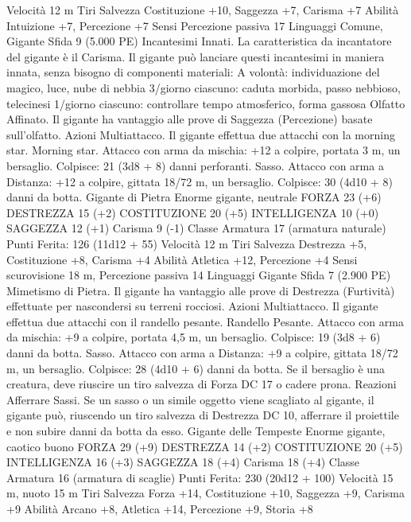 \begin{multicols}{2}
Velocità 12 m
Tiri Salvezza Costituzione +10, Saggezza +7, Carisma +7
Abilità Intuizione +7, Percezione +7
Sensi Percezione passiva 17
Linguaggi Comune, Gigante
Sfida 9 (5.000 PE)
Incantesimi Innati. La caratteristica da incantatore del gigante è
il Carisma. Il gigante può lanciare questi incantesimi in maniera
innata, senza bisogno di componenti materiali:
A volontà: individuazione del magico, luce, nube di nebbia
3/giorno ciascuno: caduta morbida, passo nebbioso, telecinesi
1/giorno ciascuno: controllare tempo atmosferico, forma gassosa
Olfatto Affinato. Il gigante ha vantaggio alle prove di Saggezza
(Percezione) basate sull’olfatto.
Azioni
Multiattacco. Il gigante effettua due attacchi con la morning star.
Morning star. Attacco con arma da mischia: +12 a colpire,
portata 3 m, un bersaglio.
Colpisce: 21 (3d8 + 8) danni perforanti.
Sasso. Attacco con arma a Distanza: +12 a colpire, gittata 18/72
m, un bersaglio.
Colpisce: 30 (4d10 + 8) danni da botta. 
Gigante di Pietra
Enorme gigante, neutrale
FORZA 23 (+6)
DESTREZZA 15 (+2)
COSTITUZIONE 20 (+5)
INTELLIGENZA 10 (+0)
SAGGEZZA 12 (+1)
Carisma 9 (-1)
Classe Armatura 17 (armatura naturale)
\hspace*{0pt}\hfill{Punti Ferita}: 126 (11d12 + 55)
Velocità 12 m
Tiri Salvezza Destrezza +5, Costituzione +8, Carisma +4
Abilità Atletica +12, Percezione +4
Sensi scurovisione 18 m, Percezione passiva 14
Linguaggi Gigante
Sfida 7 (2.900 PE)
Mimetismo di Pietra. Il gigante ha vantaggio alle prove di Destrezza
(Furtività) effettuate per nascondersi su terreni rocciosi.
Azioni
Multiattacco. Il gigante effettua due attacchi con il randello pesante.
Randello Pesante. Attacco con arma da mischia: +9 a colpire,
portata 4,5 m, un bersaglio.
Colpisce: 19 (3d8 + 6) danni da botta.
Sasso. Attacco con arma a Distanza: +9 a colpire, gittata 18/72
m, un bersaglio.
Colpisce: 28 (4d10 + 6) danni da botta. Se il bersaglio è una
creatura, deve riuscire un tiro salvezza di Forza DC 17 o cadere
prona.
Reazioni
Afferrare Sassi. Se un sasso o un simile oggetto viene scagliato al
gigante, il gigante può, riuscendo un tiro salvezza di Destrezza DC
10, afferrare il proiettile e non subire danni da botta da esso.
Gigante delle Tempeste
Enorme gigante, caotico buono
FORZA 29 (+9)
DESTREZZA 14 (+2)
COSTITUZIONE 20 (+5)
INTELLIGENZA 16 (+3)
SAGGEZZA 18 (+4)
Carisma 18 (+4)
Classe Armatura 16 (armatura di scaglie)
\hspace*{0pt}\hfill{Punti Ferita}: 230 (20d12 + 100)
Velocità 15 m, nuoto 15 m
Tiri Salvezza Forza +14, Costituzione +10, Saggezza +9,
Carisma +9
Abilità Arcano +8, Atletica +14, Percezione +9, Storia +8

\end{multicols}
